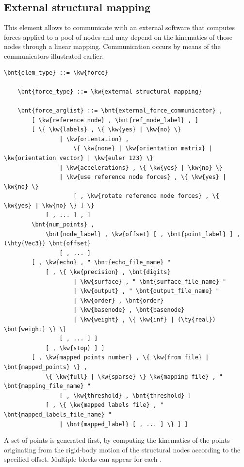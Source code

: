 \subsection{External structural mapping}
\label{sec:EL:FORCE:EXTERNAL:STRUCTURAL_MAPPING}
This element allows to communicate with an external software that computes
forces applied to a pool of nodes and may depend on the kinematics of those
nodes through a linear mapping.
Communication occurs by means of the communicators illustrated earlier.
\begin{Verbatim}[commandchars=\\\{\}]
    \bnt{elem_type} ::= \kw{force}

    \bnt{force_type} ::= \kw{external structural mapping}

    \bnt{force_arglist} ::= \bnt{external_force_communicator} ,
        [ \kw{reference node} , \bnt{ref_node_label} , ]
        [ \{ \kw{labels} , \{ \kw{yes} | \kw{no} \}
                | \kw{orientation} ,
                    \{ \kw{none} | \kw{orientation matrix} | \kw{orientation vector} | \kw{euler 123} \}
                | \kw{accelerations} , \{ \kw{yes} | \kw{no} \}
                | \kw{use reference node forces} , \{ \kw{yes} | \kw{no} \}
                    [ , \kw{rotate reference node forces} , \{ \kw{yes} | \kw{no} \} ] \}
            [ , ... ] , ]
        \bnt{num_points} ,
            \bnt{node_label} , \kw{offset} [ , \bnt{point_label} ] , (\hty{Vec3}) \bnt{offset}
                [ , ... ]
        [ , \kw{echo} , " \bnt{echo_file_name} "
            [ , \{ \kw{precision} , \bnt{digits}
                    | \kw{surface} , " \bnt{surface_file_name} "
                    | \kw{output} , " \bnt{output_file_name} "
                    | \kw{order} , \bnt{order}
                    | \kw{basenode} , \bnt{basenode}
                    | \kw{weight} , \{ \kw{inf} | (\ty{real}) \bnt{weight} \} \}
                [ , ... ] ]
            [ , \kw{stop} ] ]
        [ , \kw{mapped points number} , \{ \kw{from file} | \bnt{mapped_points} \} ,
            \{ \kw{full} | \kw{sparse} \} \kw{mapping file} , " \bnt{mapping_file_name} "
                [ , \kw{threshold} , \bnt{threshold} ]
            [ , \{ \kw{mapped labels file} , " \bnt{mapped_labels_file_name} "
                | \bnt{mapped_label} [ , ... ] \} ] ]
\end{Verbatim}
A set of  points is generated first,
by computing the kinematics of the points originating
from the rigid-body motion of the structural nodes 
according to the specified offset.
Multiple  blocks can appear for each .

